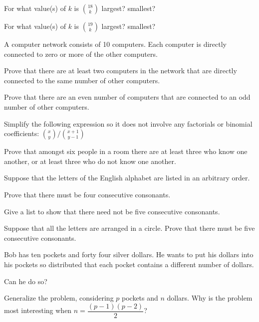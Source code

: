 \begin{pro}
For what value(s) of $k$ is $\binom{18}{k}$ largest?  smallest?
\end{pro}
\begin{pro}
For what value(s) of $k$ is $\binom{19}{k}$ largest?  smallest?
\end{pro}
\begin{pro}
A computer network consists of 10 computers.  
Each computer is directly connected to zero or more of the other computers.
\begin{lenum}
\item
Prove that there are at least two computers in the network that are directly connected to the
same number of other computers.
\item
Prove that there are an even number of computers that are connected to an odd number of
other computers.
\end{lenum}
\end{pro}
\begin{pro}
Simplify the following expression so it does not involve any factorials or binomial coefficients:
$\binom{x}{y}/\binom{x+1}{y-1}$
\end{pro}

\begin{pro}
Prove that amongst six people in a room there are at least three who
know one another, or at least three who do not know one
another.\end{pro}

\begin{pro}
Suppose that the letters of the English
alphabet are listed in an arbitrary order. \begin{lenum} \item
Prove that there must be four consecutive consonants. \item Give a
list to show that there need not be five consecutive consonants.
\item Suppose that all the letters are arranged in a circle. Prove
that there must be five consecutive consonants.
\end{lenum}

\end{pro}
\begin{pro}
Bob has ten pockets and forty four silver
dollars. He wants to put his dollars into his pockets so
distributed that each pocket contains a different number of
dollars.
\begin{lenum}\item Can he do so? \item Generalize the problem, considering $p$ pockets
and $n$ dollars. Why is the problem most interesting when 
$n =
\dfrac{(p - 1)(p - 2)}{2}$? \end{lenum} \end{pro}

